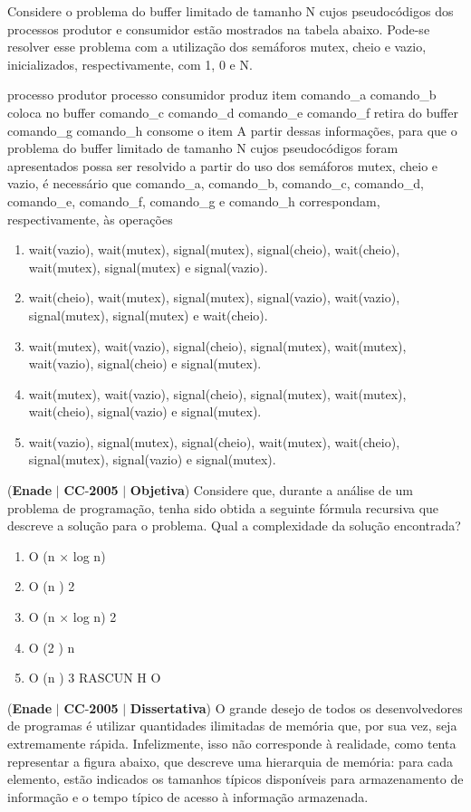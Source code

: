 \documentclass{exam}
\begin{document}
\begin{questions}
Considere o problema do buffer limitado de tamanho N
cujos pseudocódigos dos processos produtor e consumidor
estão mostrados na tabela abaixo. Pode-se resolver esse
problema com a utilização dos semáforos mutex, cheio e vazio,
inicializados, respectivamente, com 1, 0 e N.

processo produtor processo consumidor
produz item
comando\_a
comando\_b
coloca no buffer
comando\_c
comando\_d
comando\_e
comando\_f
retira do buffer
comando\_g
comando\_h
consome o item
A partir dessas informações, para que o problema do buffer
limitado de tamanho N cujos pseudocódigos foram
apresentados possa ser resolvido a partir do uso dos semáforos
mutex, cheio e vazio, é necessário que comando\_a,
comando\_b, comando\_c, comando\_d, comando\_e,
comando\_f, comando\_g e comando\_h correspondam,
respectivamente, às operações
	\begin{enumerate}[label=\alph*)]
		\item  wait(vazio), wait(mutex), signal(mutex),
signal(cheio), wait(cheio), wait(mutex),
signal(mutex) e signal(vazio).
		\item  wait(cheio), wait(mutex), signal(mutex),
signal(vazio), wait(vazio), signal(mutex),
signal(mutex) e wait(cheio).
		\item  wait(mutex), wait(vazio), signal(cheio),
signal(mutex), wait(mutex), wait(vazio),
signal(cheio) e signal(mutex).
		\item  wait(mutex), wait(vazio), signal(cheio),
signal(mutex), wait(mutex), wait(cheio),
signal(vazio) e signal(mutex).
		\item  wait(vazio), signal(mutex), signal(cheio),
wait(mutex), wait(cheio), signal(mutex),
signal(vazio) e signal(mutex).
	\end{enumerate}

\question (\textbf{Enade} $|$ \textbf{CC}-\textbf{2005} $|$ \textbf{Objetiva})
Considere que, durante a análise de um problema de programação,
tenha sido obtida a seguinte fórmula recursiva que descreve a
solução para o problema.
Qual a complexidade da solução encontrada?
	\begin{enumerate}[label=\alph*)]
		\item  O (n × log n)
		\item  O (n )
2
		\item  O (n × log n)
2
		\item  O (2 )
n
		\item  O (n )
3
RASCUN H O
	\end{enumerate}

\question (\textbf{Enade} $|$ \textbf{CC}-\textbf{2005} $|$ \textbf{Dissertativa})
O grande desejo de todos os desenvolvedores de programas é utilizar quantidades ilimitadas de memória que, por sua vez,
seja extremamente rápida. Infelizmente, isso não corresponde à realidade, como tenta representar a figura abaixo, que descreve
uma hierarquia de memória: para cada elemento, estão indicados os tamanhos típicos disponíveis para armazenamento de
informação e o tempo típico de acesso à informação armazenada.




\end{questions}
\end{document}
